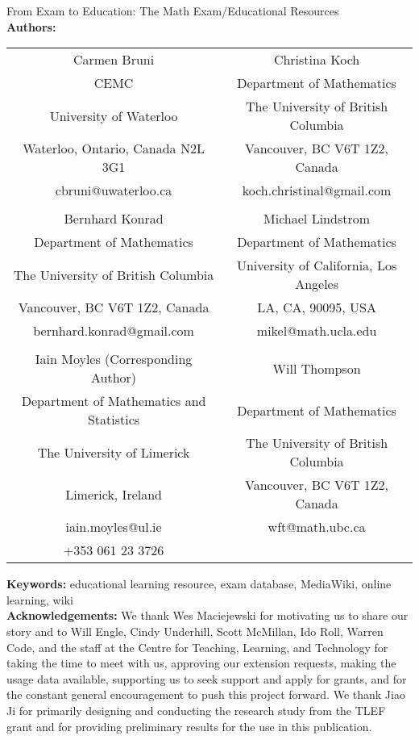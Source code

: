 \documentclass{primus}
\begin{document}
\begin{center}
{\LARGE From Exam to Education: The Math Exam/Educational Resources}
\\[2cm]
\textbf{Authors:}
\\[0.5cm]
\begin{table}[H]
\centering
\begin{tabular}{cc}
Carmen Bruni					&	Christina Koch\\
CEMC							&	Department of Mathematics\\
University of Waterloo				&	The University of British Columbia\\
Waterloo, Ontario, Canada N2L 3G1		&	Vancouver, BC V6T 1Z2, Canada\\
cbruni@uwaterloo.ca				&	koch.christinal@gmail.com\\\\
Bernhard Konrad					&	Michael Lindstrom\\
Department of Mathematics			&	Department of Mathematics\\
The University of British Columbia		&	University of California, Los Angeles\\
Vancouver, BC V6T 1Z2, Canada			&	LA, CA, 90095, USA\\
bernhard.konrad@gmail.com				&	mikel@math.ucla.edu \\\\
Iain Moyles (Corresponding Author)		&	Will Thompson\\
Department of Mathematics and Statistics	&	Department of Mathematics\\
The University of Limerick				&	The University of British Columbia\\
Limerick, Ireland					&	Vancouver, BC V6T 1Z2, Canada\\
iain.moyles@ul.ie					&	wft@math.ubc.ca\\
+353 061 23 3726 					&
\end{tabular}
\end{table}
\end{center}
\textbf{Keywords:} educational learning resource, exam database, MediaWiki, online learning, wiki
\\[1cm]
\textbf{Acknowledgements:} We thank Wes Maciejewski for motivating us to share our story and to Will Engle, Cindy Underhill, Scott McMillan, Ido Roll, Warren Code, and the staff at the Centre for Teaching, Learning, and Technology for taking the time to meet with us, approving our extension requests, making the usage data available, supporting us to seek support and apply for grants, and for the constant general encouragement to push this project forward. We thank Jiao Ji for primarily designing and conducting the research study from the TLEF grant and for providing preliminary results for the use in this publication.
\end{document}

